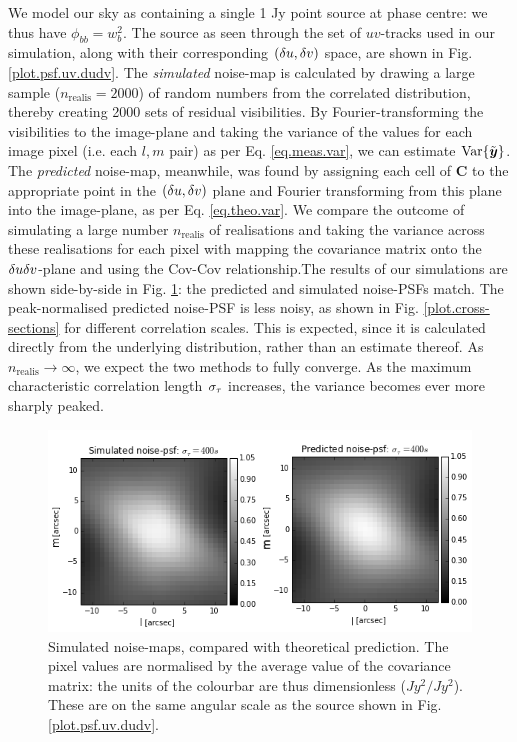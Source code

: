\pg
We model our sky as containing a single 1 Jy point source at phase centre: we thus have $\phi_{bb}=w_b^2$. The source as seen through the set of $uv$-tracks used in our simulation, along with their corresponding $\left(\delta u,\delta v\right)$ space, are shown in Fig. \ref{plot.psf.uv.dudv}. The \emph{simulated} noise-map is calculated by drawing a large sample ($n_\mathrm{realis}=2000$) of random numbers from the correlated distribution, thereby creating 2000 sets of residual visibilities. By Fourier-transforming the visibilities to the image-plane and taking the variance of the values for each image pixel (i.e. each $l,m$ pair) as per Eq. \ref{eq.meas.var}, we can estimate $\textrm{Var}\{\tilde{\bm{{{y}}}}\}$. The \emph{predicted} noise-map, meanwhile, was found by assigning each cell of $\bm{C}$ to the appropriate point in the $\left(\delta u,\delta v\right)$ plane and Fourier transforming from this plane into the image-plane, as per Eq. \ref{eq.theo.var}.
We compare the outcome of simulating a large number $n_\mathrm{realis}$ of realisations and taking the variance across these realisations for each pixel with mapping the covariance matrix onto the $\delta u\delta v$-plane and using the Cov-Cov relationship.The results of our simulations are shown side-by-side in Fig. \ref{plot.noisepsfs}: the predicted and simulated noise-PSFs match. The peak-normalised predicted noise-PSF is less noisy, as shown in Fig. \ref{plot.cross-sections} for different correlation scales. This is expected, since it is calculated directly from the underlying distribution, rather than an estimate thereof. As $n_\mathrm{realis}\rightarrow\infty$, we expect the two methods to fully converge. As the maximum characteristic correlation length $\sigma_\tau$ increases, the variance becomes ever more sharply peaked.

\begin{figure}[h!]
\centering
\includegraphics[width=\textwidth]{images/noisepsf-ctime400.png} %
\caption{\label{plot.noisepsfs} Simulated noise-maps, compared with theoretical prediction. The pixel values are normalised by the average value of the covariance matrix: the units of the colourbar are thus dimensionless ($Jy^2/Jy^2$). These are on the same angular scale as the source shown in Fig. \ref{plot.psf.uv.dudv}.}
\end{figure}

